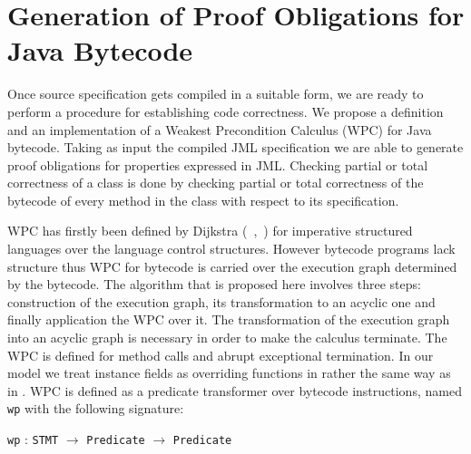 
\newtheorem{defn}{Definition} 


\section{Generation of Proof Obligations for Java Bytecode}\label{verifCond}
Once source specification gets compiled in a suitable form, we are ready to perform a procedure for establishing code correctness.
We propose a definition and an implementation of a Weakest Precondition Calculus (WPC) for Java bytecode.
Taking as input the compiled JML specification we are able to generate proof obligations for properties expressed in JML.
Checking partial or total correctness of a class is done by checking partial or total correctness of the bytecode of every method in the class with respect to its specification.

WPC has firstly been defined by Dijkstra (~\cite{WPCDS},~\cite{DisDij}) for imperative structured languages over the language control structures. However bytecode programs lack structure thus WPC for bytecode is carried over the execution graph determined by the bytecode. The algorithm that is proposed here involves three steps:  construction of the execution graph, its transformation to an acyclic one and finally application the WPC over it. The transformation of the execution graph into an acyclic graph is necessary in order to make the calculus terminate. The WPC is defined for method calls and abrupt exceptional termination. In our model we treat instance fields as overriding functions in rather the same way as in \cite{ProBor}. WPC is defined as a predicate transformer over bytecode instructions, named \texttt{wp} with the following signature: 
\begin{center} \texttt{wp} : \texttt{STMT} $\longrightarrow$ \texttt{Predicate} $\longrightarrow$ \texttt{Predicate}\end{center}

